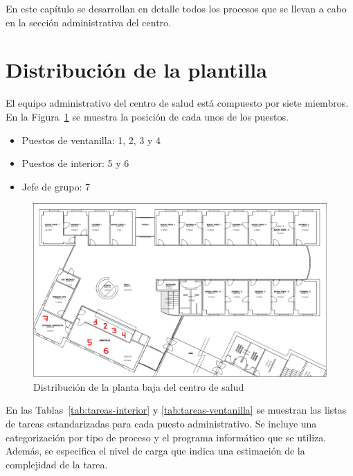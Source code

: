 En este capítulo se desarrollan en detalle todos los procesos que se llevan a cabo en la sección administrativa del centro.

\section{Distribución de la plantilla}

El equipo administrativo del centro de salud está compuesto por siete miembros. En la Figura~\ref{fig:plano-interior} se muestra la posición de cada unos de los puestos.

\begin{itemize}
    \item Puestos de ventanilla: 1, 2, 3 y 4
    \item Puestos de interior: 5 y 6
    \item Jefe de grupo: 7
\end{itemize}

\begin{figure}[H]
    \centering
    \includegraphics[width=\textwidth]{img/plano-interior.png}
    \caption{Distribución de la planta baja del centro de salud}
    \label{fig:plano-interior}
\end{figure}

En las Tablas~\ref{tab:tareas-interior} y \ref{tab:tareas-ventanilla} se muestran las listas de tareas estandarizadas para cada puesto administrativo.
Se incluye una categorización por tipo de proceso y el programa informático que se utiliza. Además, se especifica el nivel de carga que indica una estimación de la complejidad de la tarea.

